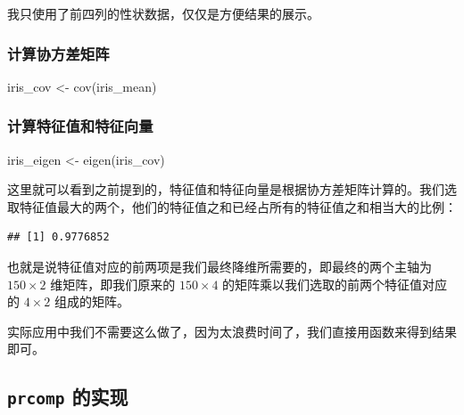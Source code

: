 \documentclass[
]{krantz}
\makeatletter
\newenvironment{Shaded}{\begin{snugshade}}{\end{snugshade}}
\newcommand{\DecValTok}[1]{\textcolor[rgb]{0.00,0.00,0.81}{#1}}
\newcommand{\FunctionTok}[1]{\textcolor[rgb]{0.00,0.00,0.00}{#1}}
\newcommand{\NormalTok}[1]{#1}
\newcommand{\OtherTok}[1]{\textcolor[rgb]{0.56,0.35,0.01}{#1}}
\newcommand{\SpecialCharTok}[1]{\textcolor[rgb]{0.00,0.00,0.00}{#1}}
\newenvironment{kframe}{%
\medskip{}
\setlength{\fboxsep}{.8em}
 \def\at@end@of@kframe{}%
 \ifinner\ifhmode%
  \def\at@end@of@kframe{\end{minipage}}%
  \begin{minipage}{\columnwidth}%
 \fi\fi%
 \def\FrameCommand##1{\hskip\@totalleftmargin \hskip-\fboxsep
 \colorbox{shadecolor}{##1}\hskip-\fboxsep
     \hskip-\linewidth \hskip-\@totalleftmargin \hskip\columnwidth}%
 \MakeFramed {\advance\hsize-\width
   \@totalleftmargin\z@ \linewidth\hsize
   \@setminipage}}%
 {\par\unskip\endMakeFramed%
 \at@end@of@kframe}
\renewenvironment{Shaded}{\begin{kframe}}{\end{kframe}}
\makeatother
\begin{document}
我只使用了前四列的性状数据，仅仅是方便结果的展示。

\hypertarget{cov_val}{%
\subsubsection{计算协方差矩阵}\label{cov_val}}

\begin{Shaded}
\begin{Highlighting}[]
\NormalTok{iris\_cov }\OtherTok{\textless{}{-}} \FunctionTok{cov}\NormalTok{(iris\_mean)}
\end{Highlighting}
\end{Shaded}

\hypertarget{eig_val}{%
\subsubsection{计算特征值和特征向量}\label{eig_val}}

\begin{Shaded}
\begin{Highlighting}[]
\NormalTok{iris\_eigen }\OtherTok{\textless{}{-}} \FunctionTok{eigen}\NormalTok{(iris\_cov)}
\end{Highlighting}
\end{Shaded}

这里就可以看到之前提到的，特征值和特征向量是根据协方差矩阵计算的。我们选取特征值最大的两个，他们的特征值之和已经占所有的特征值之和相当大的比例：

\begin{Shaded}
\end{Shaded}

\begin{verbatim}
## [1] 0.9776852
\end{verbatim}

也就是说特征值对应的前两项是我们最终降维所需要的，即最终的两个主轴为 \(150 \times 2\) 维矩阵，即我们原来的 \(150 \times 4\) 的矩阵乘以我们选取的前两个特征值对应的 \(4 \times 2\) 组成的矩阵。

实际应用中我们不需要这么做了，因为太浪费时间了，我们直接用函数来得到结果即可。

\hypertarget{prcom}{%
\subsection{\texorpdfstring{\texttt{prcomp} 的实现}{prcomp 的实现}}\label{prcom}}
\end{document}
